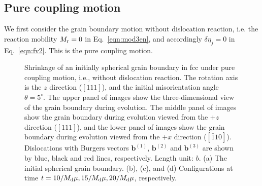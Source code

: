 \subsection{Pure coupling motion} \label{subsec:coup}
We first consider the grain boundary motion without dislocation reaction, i.e. the reaction mobility $M_{\rm r}=0$ in Eq.~\eqref{eqn:mod3en}, and accordingly $\delta \eta_j=0$ in Eq.~\eqref{eqn:fv2}. This is the pure coupling motion.


\begin{figure}[htbp]
	\centering
	\centering
	\caption{Shrinkage of an initially spherical grain boundary in fcc under pure coupling motion, i.e., without dislocation reaction. The rotation axis is the $z$ direction ($[111]$), and the initial misorientation angle $\theta=5^\circ$. The upper panel of images show the three-dimensional view of the grain boundary during evolution. The middle panel of images show the grain boundary during evolution viewed from the $+z$ direction ($[111]$), and the lower panel of images show the grain boundary during evolution viewed from the $+x$ direction ($[\bar{1}10]$). Dislocations with Burgers vectors $\mathbf b^{(1)}$, $\mathbf b^{(2)}$ and $\mathbf b^{(3)}$ are shown by blue, black and red lines, respectively. Length unit: $b$. (a) The initial spherical grain boundary. (b), (c), and (d) Configurations at time $t=10/M_{\rm d}\mu, 15/M_{\rm d}\mu, 20/M_{\rm d}\mu$, respectively.}\label{fig:fccfigure0}
\end{figure}


